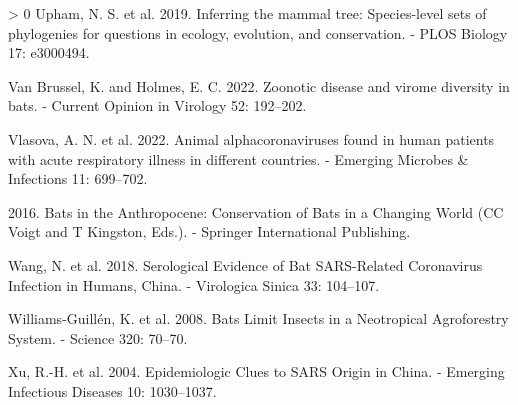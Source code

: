 \documentclass[11pt]{article}
\newlength{\cslhangindent}
\newenvironment{CSLReferences}[3] %
 {%
  \setlength{\parindent}{0pt}
  \ifodd #1 \everypar{\setlength{\hangindent}{\cslhangindent}}\ignorespaces\fi
  \ifnum #2 > 0
  \setlength{\parskip}{#2\baselineskip}
  \fi
 }%
 {}
\begin{document}
\begin{CSLReferences}{1}{0}
\leavevmode\hypertarget{ref-Upham2019InfMam}{}%
Upham, N. S. et al. 2019. Inferring the mammal tree: Species-level sets
of phylogenies for questions in ecology, evolution, and conservation. -
PLOS Biology 17: e3000494.

\leavevmode\hypertarget{ref-VanBrussel2022ZooDis}{}%
Van Brussel, K. and Holmes, E. C. 2022. Zoonotic disease and virome
diversity in bats. - Current Opinion in Virology 52: 192--202.

\leavevmode\hypertarget{ref-Vlasova2022AniAlp}{}%
Vlasova, A. N. et al. 2022. Animal alphacoronaviruses found in human
patients with acute respiratory illness in different countries. -
Emerging Microbes \& Infections 11: 699--702.

\leavevmode\hypertarget{ref-Voigt2016BatAnt}{}%
2016. Bats in the Anthropocene: Conservation of Bats in a Changing World
(CC Voigt and T Kingston, Eds.). - Springer International Publishing.

\leavevmode\hypertarget{ref-Wang2018SerEvi}{}%
Wang, N. et al. 2018. Serological Evidence of Bat SARS-Related
Coronavirus Infection in Humans, China. - Virologica Sinica 33:
104--107.

\leavevmode\hypertarget{ref-Williams-Guillen2008BatLim}{}%
Williams-Guillén, K. et al. 2008. Bats Limit Insects in a Neotropical
Agroforestry System. - Science 320: 70--70.

\leavevmode\hypertarget{ref-Xu2004EpiClu}{}%
Xu, R.-H. et al. 2004. Epidemiologic Clues to SARS Origin in China. -
Emerging Infectious Diseases 10: 1030--1037.

\end{CSLReferences}
\end{document}
